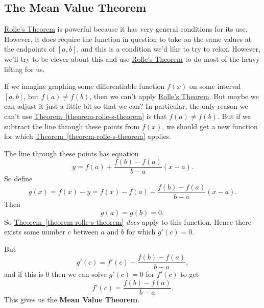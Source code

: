 \documentclass[10pt,]{book}
\newcommand{\terminology}[1]{\textbf{#1}}
\theoremstyle{ptxplainnotitle}
\theoremstyle{ptxplaintitle}
\theoremstyle{ptxplainnotitle}
\theoremstyle{ptxplaintitle}
\theoremstyle{ptxplainnotitle}
\theoremstyle{ptxplaintitle}
\theoremstyle{ptxdefinitionnotitle}
\theoremstyle{ptxdefinitiontitle}
\theoremstyle{ptxdefinitionnotitle}
\theoremstyle{ptxdefinitiontitle}
\theoremstyle{ptxdefinitionnotitle}
\theoremstyle{ptxdefinitiontitle}
\theoremstyle{ptxdefinitionnotitle}
\theoremstyle{ptxdefinitiontitle}
\theoremstyle{ptxdefinitionnotitle}
\theoremstyle{ptxdefinitiontitle}
\numberwithin{equation}{section}
\begin{document}
\subsection[{The Mean Value Theorem}]{The Mean Value Theorem}\label{subsection-the-mean-value-theorem}
\hypertarget{p-334}{}%
\hyperref[theorem-rolle-s-theorem]{Rolle's Theorem} is powerful because it has very general conditions for its use. However, it does require the function in question to take on the same values at the endpoints of \([a,b]\), and this is a condition we'd like to try to relax. However, we'll try to be clever about this and use \hyperref[theorem-rolle-s-theorem]{Rolle's Theorem} to do most of the heavy lifting for us.%
\par
\hypertarget{p-335}{}%
If we imagine graphing some differentiable function \(f(x)\) on some interval \([a,b]\), but \(f(a)\neq f(b)\), then we can't apply \hyperref[theorem-rolle-s-theorem]{Rolle's Theorem}. But maybe we can adjust it just a little bit so that we can? In particular, the only reason we can't use \hyperref[theorem-rolle-s-theorem]{Theorem~\ref{theorem-rolle-s-theorem}} is that \(f(a)\neq f(b)\). But if we subtract the line through these points from \(f(x)\), we should get a new function for which \hyperref[theorem-rolle-s-theorem]{Theorem~\ref{theorem-rolle-s-theorem}} applies.%
\par
\hypertarget{p-336}{}%
The line through these points has equation%
\begin{equation*}
y = f(a) + \frac{f(b) - f(a)}{b-a}(x-a).
\end{equation*}
So define%
\begin{equation*}
g(x) = f(x) - y = f(x) - f(a) - \frac{f(b) - f(a)}{b-a}(x-a).
\end{equation*}
Then%
\begin{equation*}
g(a) = g(b) = 0,
\end{equation*}
So \hyperref[theorem-rolle-s-theorem]{Theorem~\ref{theorem-rolle-s-theorem}} \emph{does} apply to this function. Hence there exists some number \(c\) between \(a\) and \(b\) for which \(g'(c) = 0\).%
\par
\hypertarget{p-337}{}%
But%
\begin{equation*}
g'(c) = f'(c) - \frac{f(b) - f(a)}{b-a},
\end{equation*}
and if this is \(0\) then we can solve \(g'(c) = 0\) for \(f'(c)\) to get%
\begin{equation*}
f'(c) = \frac{f(b) - f(a)}{b-a}.
\end{equation*}
This gives us the \terminology{Mean Value Theorem}.%
\end{document}
